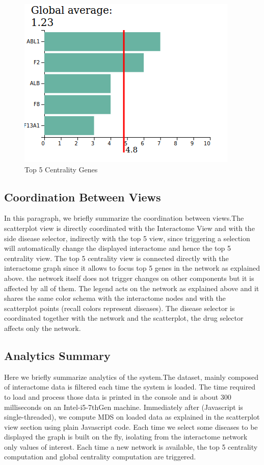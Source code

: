 \documentclass[12pt,twocolumn,twoside]{article}
\begin{document}
	\begin{figure}
		\includegraphics[width=.95\linewidth]{top5.png}
		\caption{Top 5 Centrality Genes}
		\label{top5}
	\end{figure}
	
	\subsection*{Coordination Between Views}
	In this paragraph, we briefly summarize the coordination between views.\newline The scatterplot view is directly coordinated with the Interactome View and with the side disease selector, indirectly with the top 5 view, since triggering a selection will automatically change the displayed interactome and hence the top 5 centrality view.
	The top 5 centrality view is connected directly with the interactome graph since it allows to focus top 5 genes in the network as explained above. the network itself does not trigger changes on other components but it is affected by all of them. The legend acts on the network as explained above and it shares the same color schema with the interactome nodes and with the scatterplot points (recall colors represent diseases). The disease selector is coordinated together with the network and the scatterplot, the drug selector affects only the network.
	
	
	\subsection*{Analytics Summary}
	Here we briefly summarize analytics of the system.\newline The dataset, mainly composed of interactome data is filtered each time the system is loaded. The time required to load and process those data is printed in the console and is about 300 milliseconds on an Intel-i5-7thGen machine. Immediately after (Javascript is single-threaded), we compute MDS on loaded data as explained in the scatterplot view section using plain Javascript code. Each time we select some diseases to be displayed the graph is built on the fly, isolating from the interactome network only values of interest. Each time a new network is available, the top 5 centrality computation and global centrality computation are triggered.
	
\end{document}
